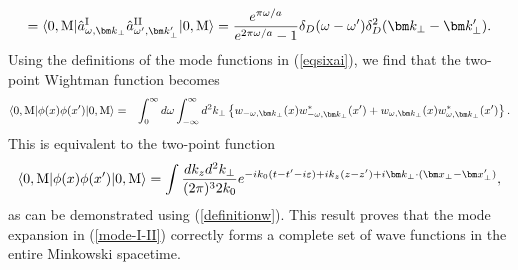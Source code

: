 \documentclass[aps,prd,preprintnumbers,nofootinbib,showpacs]{revtex4}%
\begin{document}
\begin{widetext}
\begin{eqnarray}
= \langle0,{\rm M}|\hat a_{\omega,{\bm k}_\perp}^{\rm I }\hat a_{\omega',{\bm k}_\perp'}^{\rm II}|0,{\rm M}\rangle
={e^{\pi\omega/a}\over e^{2\pi\omega/a}-1}\delta_D(\omega-\omega')\delta_D^2(\bm k_\perp-\bm k_\perp').
\nonumber
\end{eqnarray}
Using the definitions of the mode functions in (\ref{eqsixai}), 
we find that the two-point Wightman function becomes
\begin{eqnarray}
\langle0,{\rm M}|\phi(x)\phi(x')|0,{\rm M}\rangle
&=&\int_0^{\infty}d\omega\int_{-\infty}^{\infty} 
 d^2 k_\perp \left\{ w_{-\omega,\bm k_\perp}(x)w^*_{-\omega,\bm k_\perp}(x')
+w_{\omega,\bm k_\perp}(x)w^*_{\omega,\bm k_\perp}(x')\right\}.
\end{eqnarray}
This is equivalent to the two-point function 
\begin{eqnarray}
  \langle0,{\rm M}|\phi(x)\phi(x')|0,{\rm M}\rangle=\int {dk_zd^2 k_\perp\over (2\pi)^{3}2k_0}
{e^{-i k_0 (t-t'-i\varepsilon)+ik_z(z-z')+i\bm k_\perp\cdot(\bm x_\perp-\bm x_\perp')} },
\end{eqnarray}
as can be demonstrated using (\ref{definitionw}).
This result proves that the mode expansion in (\ref{mode-I-II}) correctly forms a complete set of wave functions
in the entire Minkowski spacetime.

\end{widetext}
\end{document}
